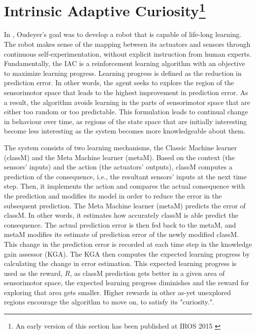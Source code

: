 \section[Intrinsic Adaptive Curiosity] {Intrinsic Adaptive Curiosity\footnote{An early version of this section has been published at IROS 2015 \cite{Chan2015} }}

In \cite{Oudeyer2007}, Oudeyer's goal was to develop a robot that is capable of life-long learning. The robot makes sense of the mapping between its actuators and sensors through continuous self-experimentation, without explicit instruction from human experts. Fundamentally, the IAC is a reinforcement learning algorithm with an objective to maximize learning progress. Learning progress is defined as the reduction in prediction error. In other words, the agent seeks to explore the region of the sensorimotor space that leads to the highest improvement in prediction error. As a result, the algorithm avoids learning in the parts of sensorimotor space that are either too random or too predictable. This formulation leads to continual change in behaviour over time, as regions of the state space that are initially interesting become less interesting as the system becomes more knowledgeable about them. 

The system consists of two learning mechanisms, the Classic Machine learner (classM) and the Meta Machine learner (metaM).  Based on the context (the sensors' inputs) and the action (the actuators' outputs), classM computes a prediction of the consequence, i.e., the resultant sensors' inputs at the next time step. Then, it implements the action and compares the actual consequence with the prediction and modifies its model in order to reduce the error in the subsequent prediction. The Meta Machine learner (metaM) predicts the error of classM. In other words, it estimates how accurately classM is able predict the consequence. The actual prediction error is then fed back to the metaM, and metaM modifies its estimate of prediction error of the newly modified classM. This change in the prediction error is recorded at each time step in the knowledge gain assessor (KGA). The KGA then computes the expected learning progress by calculating the change in error estimation. This expected learning progress is used as the reward, $R$, as classM prediction gets better in a given area of sensorimotor space, the expected learning progress diminishes and the reward for exploring that area gets smaller. Higher rewards in other as-yet unexplored regions encourage the algorithm to move on, to satisfy its "curiosity.". 

